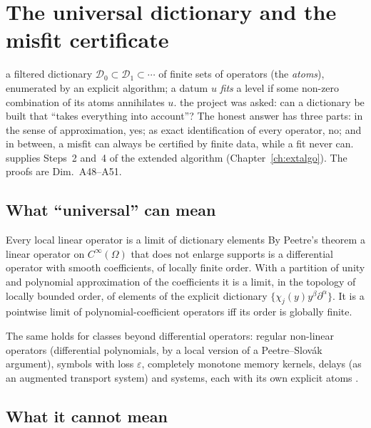 \chapter{The universal dictionary and the misfit certificate}\label{ch:dictionary}
\chapterbrief
{a filtered dictionary $\mathcal D_0\subset\mathcal D_1\subset\cdots$ of finite sets of operators (the \emph{atoms}), enumerated by an explicit algorithm; a datum $u$ \emph{fits} a level if some non-zero combination of its atoms annihilates $u$.}
{the project was asked: can a dictionary be built that ``takes everything into account''? The honest answer has three parts: in the sense of approximation, yes; as exact identification of every operator, no; and in between, a misfit can always be certified by finite data, while a fit never can.}
{supplies Steps~2 and~4 of the extended algorithm (Chapter~\ref{ch:extalgo}). The proofs are Dim.~A48--A51.}

\section{What ``universal'' can mean}

\begin{theorem}{Every local linear operator is a limit of dictionary elements  \proved}\label{thm:dictu1}
By Peetre's theorem a linear operator on $C^\infty(\Omega)$ that does not enlarge supports is a differential operator with smooth coefficients, of locally finite order. With a partition of unity and polynomial approximation of the coefficients it is a limit, in the topology of locally bounded order, of elements of the explicit dictionary $\{\chi_j(y)y^\beta\partial^\alpha\}$. It is a pointwise limit of polynomial-coefficient operators iff its order is globally finite.
\end{theorem}

The same holds for classes beyond differential operators: regular non-linear operators (differential polynomials, by a local version of a Peetre--Slov\'ak argument), symbols with loss $\varepsilon$, completely monotone memory kernels, delays (as an augmented transport system) and systems, each with its own explicit atoms .

\section{What it cannot mean}

